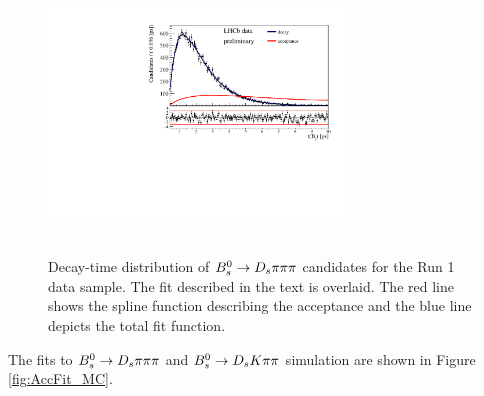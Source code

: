 \begin{figure}[h]
\includegraphics[height=7.4cm,width=0.7\textwidth]{figs/SplineAcc_data_Fit.pdf}
\caption{Decay-time distribution of ${{B}^0_{s}}\rightarrow{\ensuremath{{D}_{s}}}{\ensuremath{\pi}}{\ensuremath{\pi}}{\ensuremath{\pi}}$ candidates for the Run 1 data sample. The fit described in the text is overlaid.
The red line shows the spline function describing the acceptance and the blue line depicts the total fit function.}
\label{fig:AccFit_data}
\end{figure}


The fits to ${{B}^0_{s}}\rightarrow{\ensuremath{{D}_{s}}}{\ensuremath{\pi}}{\ensuremath{\pi}}{\ensuremath{\pi}}$ and ${{B}^0_{s}}\rightarrow{\ensuremath{{D}_{s}}}{\ensuremath{K}}{\ensuremath{\pi}}{\ensuremath{\pi}}$ simulation are shown in Figure \ref{fig:AccFit_MC}. 


